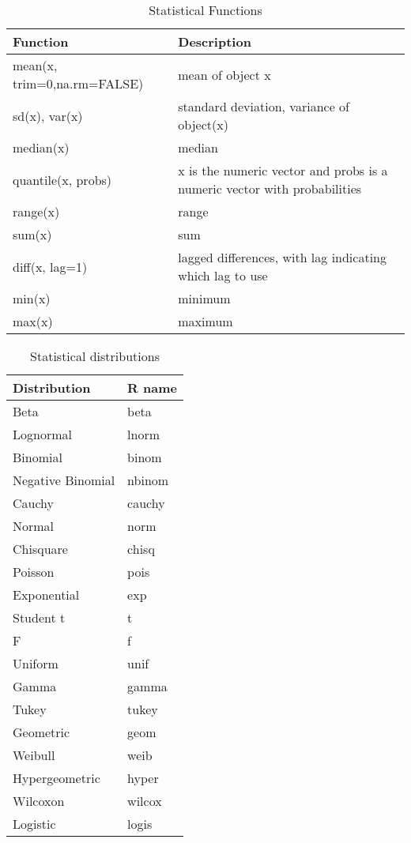 \documentclass[11pt,a4paper]{article}
\newcommand{\1}{\mathbb{1}}
\begin{document}
\begin{table}
\caption{Statistical Functions}
\begin{center}
\begin{tabular}{ll}
Function & 	Description \\ \hline 
mean(x, trim=0,na.rm=FALSE) &	mean of object x\\
sd(x), var(x) 	& standard deviation, variance of object(x) \\
median(x) &	median \\
quantile(x, probs) & x is the numeric vector and probs is a numeric vector with probabilities \\
range(x) &	range \\
sum(x) &	sum \\
diff(x, lag=1) &	lagged differences, with lag indicating which lag to use \\
min(x) & 	minimum \\
max(x) &	maximum \\ \hline 
\end{tabular} 
\end{center}
\end{table}

\begin{table}
\caption{Statistical distributions}
\begin{center}
\begin{tabular}{ll}
Distribution 	& R name \\ \hline 
Beta 	& beta 	\\
Lognormal &	lnorm \\
Binomial &	binom 	\\
Negative Binomial &	nbinom \\
Cauchy & 	cauchy 	\\
Normal &	 norm \\
Chisquare &	chisq \\ 
Poisson & 	pois \\
Exponential &	exp \\ 
Student t &	t \\
F 	& f 	\\
Uniform &	unif \\
Gamma 	& gamma  \\
Tukey 	& tukey \\
Geometric &	geom \\	
Weibull 	& weib \\
Hypergeometric &	hyper \\	
Wilcoxon &	wilcox \\
Logistic &	logis \\	 \hline 	 
\end{tabular} 
\end{center}
\end{table}
\end{document}
